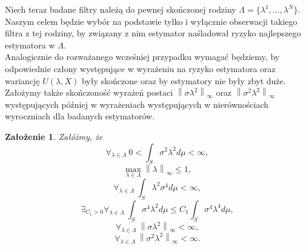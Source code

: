 \documentclass{article}
\newtheorem{za}{Założenie}
\newcommand{\norm}[1]{\left\lVert#1\right\rVert}
\begin{document}
Niech teraz badane filtry należą do pewnej skończonej rodziny $\Lambda=\{\lambda^1,\dots ,\lambda^N\}$. Naszym celem będzie wybór na podstawie tylko i wyłącznie obserwacji takiego filtra z tej rodziny, by związany z nim estymator naśladował ryzyko najlepszego estymatora w $\Lambda$.\\
Analogicznie do rozważanego wcześniej przypadku wymagać będziemy, by odpowiednie człony występujące w wyrażeniu na ryzyko  estymatora oraz wariancję $U(\lambda, X)$ były skończone oraz by estymatory nie były zbyt duże. Założymy także skończoność wyrażeń postaci $\norm{\sigma\lambda^2}_{\infty}$ oraz $\norm{\sigma^2\lambda^2}_{\infty}$ występujących później w wyrażeniach występujących w nierównościach wyroczniach dla badanych estymatorów.
\begin{za}\label{assbig}
Załóżmy, że
\begin{displaymath}
\forall_{\lambda \in \Lambda}\ 0<\int_S\sigma^2\lambda^2d\mu <\infty,
\end{displaymath}
\begin{displaymath}
\max_{\lambda \in \Lambda}\norm{\lambda}_{\infty}\leq 1,
\end{displaymath}
\begin{displaymath}
\forall_{\lambda \in \Lambda}\ \int_S\lambda^2\sigma^4d\mu <\infty,
\end{displaymath}
\begin{displaymath}
\exists_{C_1>0}\forall_{\lambda \in \Lambda}\ \int_S \sigma^4\lambda^2 d\mu \leq C_1\int_S\sigma^4\lambda^4d\mu,
\end{displaymath}
\begin{displaymath}
\forall_{\lambda \in \Lambda}\ \norm{\sigma\lambda^2}_{\infty}<\infty,
\end{displaymath}
\begin{displaymath}
\forall_{\lambda \in \Lambda}\ \norm{\sigma^2\lambda^2}_{\infty}<\infty.
\end{displaymath}
\end{za}
\end{document}
